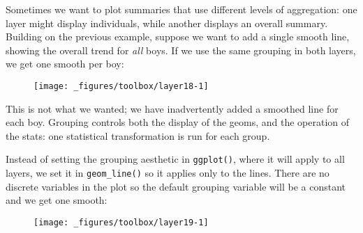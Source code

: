 Sometimes we want to plot summaries that use different levels of
aggregation: one layer might display individuals, while another displays
an overall summary. Building on the previous example, suppose we want to
add a single smooth line, showing the overall trend for \emph{all} boys.
If we use the same grouping in both layers, we get one smooth per boy:

\begin{Shaded}
\begin{Highlighting}[]
 \StringTok{ }
\StringTok{  }\NormalTok{() +}\StringTok{ }
\StringTok{  }\NormalTok{(} \NormalTok{, } \NormalTok{)}
\end{Highlighting}
\end{Shaded}

\begin{figure}[H]
  \centering
  \texttt{[image: \_figures/toolbox/layer18-1]}
\end{figure}

This is not what we wanted; we have inadvertently added a smoothed line
for each boy. Grouping controls both the display of the geoms, and the
operation of the stats: one statistical transformation is run for each
group.

Instead of setting the grouping aesthetic in \texttt{ggplot()}, where it
will apply to all layers, we set it in \texttt{geom\_line()} so it
applies only to the lines. There are no discrete variables in the plot
so the default grouping variable will be a constant and we get one
smooth:

\begin{Shaded}
\begin{Highlighting}[]
\StringTok{ }
\StringTok{  }\NormalTok{(}\NormalTok{(} \StringTok{ }
\StringTok{  }\NormalTok{(} \NormalTok{, } \NormalTok{, } \NormalTok{)}
\end{Highlighting}
\end{Shaded}

\begin{figure}[H]
  \centering
  \texttt{[image: \_figures/toolbox/layer19-1]}
\end{figure}


